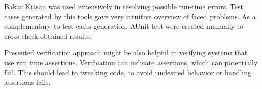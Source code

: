 Bakar Kiasan was used extensively in resolving possible run-time errors. Test cases generated by this tools gave very intuitive overview of faced problems. As a complementary to test cases generation, AUnit test were created manually to cross-check obtained results.

Presented verification approach might be also helpful in verifying systems that use run time assertions. Verification can indicate assertions, which can potentially fail. This should lead to tweaking code, to avoid undesired behavior or handling assertions fails.


